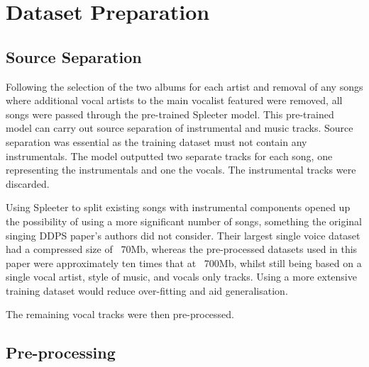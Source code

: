 \section{Dataset Preparation}

\subsection{Source Separation}

Following the selection of the two albums for each artist and removal of any songs where additional vocal artists to the main vocalist featured were removed, all songs were passed through the pre-trained Spleeter model\cite{SpleeterPip}\cite{SpleeterPip}. This pre-trained model can carry out source separation of instrumental and music tracks. Source separation was essential as the training dataset must not contain any instrumentals. The model outputted two separate tracks for each song, one representing the instrumentals and one the vocals. The instrumental tracks were discarded.

Using Spleeter to split existing songs with instrumental components opened up the possibility of using a more significant number of songs, something the original singing DDPS paper's authors did not consider. Their largest single voice dataset had a compressed size of ~70Mb, whereas the pre-processed datasets used in this paper were approximately ten times that at ~700Mb, whilst still being based on a single vocal artist, style of music, and vocals only tracks. Using a more extensive training dataset would reduce over-fitting and aid generalisation.

The remaining vocal tracks were then pre-processed.

\subsection{Pre-processing}

